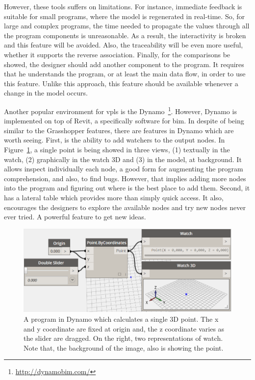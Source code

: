 However, these tools suffers on limitations. For instance, immediate feedback is suitable for small programs, where the model is regenerated in real-time. So, for large and complex programs, the time needed to propagate the values through all the program components is unreasonable. As a result, the interactivity is broken and this feature will be avoided. Also, the traceability will be even more useful, whether it supports the reverse association. Finally, for the comparisons be showed, the designer should add another component to the program. It requires that he understands the program, or at least the main data flow, in order to use this feature. Unlike this approach, this feature should be available whenever a change in the model occurs.

Another popular environment for \ac{vpls} is the Dynamo~\footnote{\url{http://dynamobim.com/}}. However, Dynamo is implemented on top of Revit, a specifically software for \ac{bim}. In despite of being similar to the Grasshopper features, there are features in Dynamo which are worth seeing. First, is the ability to add watchers to the output nodes. In Figure~\ref{fig:dynamo}, a single point is being showed in three views, (1) textually in the watch, (2) graphically in the watch 3D and (3) in the model, at background. It allows inspect individually each node, a good form for augmenting the program comprehension, and also, to find bugs. However, that implies adding more nodes into the program and figuring out where is the best place to add them. Second, it has a lateral table which provides more than simply quick access. It also, encourages the designers to explore the available nodes and try new nodes never ever tried. A powerful feature to get new ideas. 

\begin{figure}[!htbp]
  \centering
  \includegraphics[scale=0.3]{img/dynamo}
    \caption{A program in Dynamo which calculates a single 3D point. The x and y coordinate are fixed at origin and, the z coordinate varies as the slider are dragged. On the right, two representations of watch. Note that, the background of the image, also is showing the point.}
  \label{fig:dynamo}
\end{figure}

